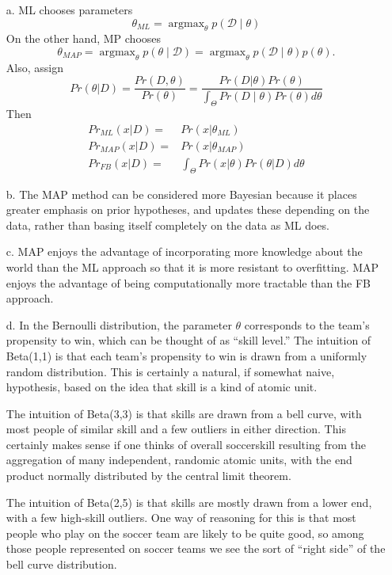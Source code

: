 \documentclass[12pt]{amsart}
\newcommand{\cal}[1]{\mathcal{#1}}
\DeclareMathOperator{\argmax}{argmax}
\theoremstyle{remark}
\begin{document}
\begin{enumerate}
\item[a.] ML chooses parameters
\[
\theta_{ML} = \argmax_{\theta} p(\cal{D} \mid \theta)
\] On the other hand, MP chooses 
\[
\theta_{MAP} = \argmax_{\theta} p(\theta \mid \cal{D}) = \argmax_{\theta} p(\cal{D} \mid \theta) p(\theta).
\]
Also, assign
\[
Pr(\theta|D) = \frac{Pr(D, \theta)}{Pr(\theta)} = \frac{Pr(D|\theta)Pr(\theta)}{\int_{\Theta} Pr(D \mid \theta)Pr(\theta)d\theta}
\]
Then
\begin{align*}
Pr_{ML}(x|D) =& Pr(x|\theta_{ML})\\
Pr_{MAP}(x|D) = & Pr(x|\theta_{MAP})\\
Pr_{FB}(x|D) = & \int_{\Theta} Pr(x|\theta)Pr(\theta|D) d\theta
\end{align*}


\item[b.]
The MAP method can be considered more Bayesian because it places greater emphasis on prior hypotheses, and updates these depending on the data, rather than basing itself completely on the data as ML does.

\item[c.]
MAP enjoys the advantage of incorporating more knowledge about the world than the ML approach so that it is more resistant to overfitting. MAP enjoys the advantage of being computationally more tractable than the FB approach.

\item[d.] In the Bernoulli distribution, the parameter $\theta$ corresponds to the team's propensity to win, which can be thought of as ``skill level.'' The intuition of Beta(1,1) is that each team's propensity to win is drawn from a uniformly random distribution. This is certainly a natural, if somewhat naive, hypothesis, based on the idea that skill is a kind of atomic unit.

 The intuition of Beta(3,3) is that skills are drawn from a bell curve, with most people of similar skill and a few outliers in either direction. This certainly makes sense if one thinks of overall soccerskill resulting from the aggregation of many independent, randomic atomic units, with the end product normally distributed by the central limit theorem. 
 
 The intuition of Beta(2,5) is that skills are mostly drawn from a lower end, with a few high-skill outliers. One way of reasoning for this is that most people who play on the soccer team are likely to be quite good, so among those people represented on soccer teams we see the sort of ``right side'' of the bell curve distribution. 


\end{enumerate}
\end{document}
